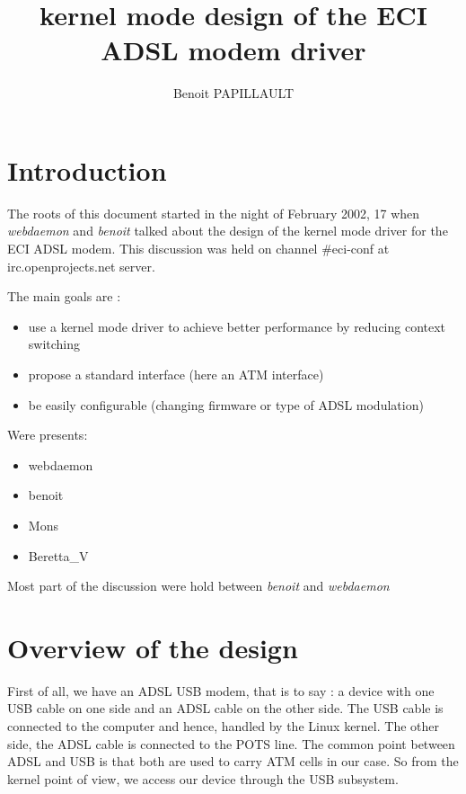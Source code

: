 \documentclass[a4paper,12pt]{article}
\title{\huge{kernel mode design of the ECI ADSL modem driver}}
\author{Benoit PAPILLAULT}
\begin{document}
\maketitle
\newpage
\tableofcontents
\newpage

\section{Introduction}

The roots of this document started in the night of February 2002, 17
when \textit{webdaemon} and \textit{benoit} talked about the design of
the kernel mode driver for the ECI ADSL modem. This discussion was
held on channel \#eci-conf at irc.openprojects.net server.

The main goals are :
\begin{itemize}

\item use a kernel mode driver to achieve better performance by
  reducing context switching

\item propose a standard interface (here an ATM interface)

\item be easily configurable (changing firmware or type of ADSL
  modulation)

\end{itemize}

Were presents:
\begin{itemize}
\item webdaemon
\item benoit
\item Mons
\item Beretta\_V
\end{itemize}

Most part of the discussion were hold between \textit{benoit} and \textit{webdaemon}

\section{Overview of the design}

First of all, we have an ADSL USB modem, that is to say : a device
with one USB cable on one side and an ADSL cable on the other side.
The USB cable is connected to the computer and hence, handled by the
Linux kernel. The other side, the ADSL cable is connected to the POTS
line. The common point between ADSL and USB is that both are used to
carry ATM cells in our case. So from the kernel point of view, we
access our device through the USB subsystem.
\end{document}
